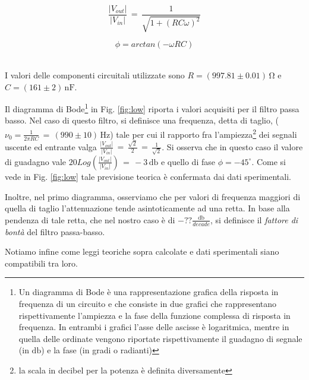 \noindent
\begin{minipage}{.5\linewidth}
\begin{equation}
\frac{|V_{out}|}{|V_{in}|}\,=\,\frac{1}{\sqrt{1+(RC\omega)^2}}
\label{eq:lowGain}
\end{equation}
\end{minipage}%
\begin{minipage}{.5\linewidth}
\begin{equation}
\phi=arctan(-\omega R C)
\label{eq:lowPhi}
\end{equation}
\end{minipage}\\

\noindent I valori delle componenti circuitali utilizzate sono $R=(997.81 \pm 0.01)\,\si{\ohm}$ e $C=(161 \pm 2)\,\si{\nano\farad}$.

Il diagramma di Bode\footnote{Un diagramma di Bode è una rappresentazione grafica della risposta in frequenza di un circuito e che consiste in due grafici che rappresentano rispettivamente l'ampiezza e la fase della funzione complessa di risposta in frequenza. In entrambi i grafici l'asse delle ascisse è logaritmica, mentre in quella delle ordinate vengono riportate rispettivamente il guadagno di segnale (in $\si{\decibel}$) e la fase (in gradi o radianti)} in Fig. \ref{fig:low} riporta i valori acquisiti per il filtro passa basso. Nel caso di questo filtro, si definisce una frequenza, detta di taglio, ($\nu_0=\frac{1}{2 \pi RC}\,=\,(990\pm10)\,\si{\hertz}$) tale per cui il rapporto fra l'ampiezza\footnote{la scala in decibel per la potenza è definita diversamente} dei segnali uscente ed entrante valga $\frac{|V_{out}|}{|V_{in}|}\,=\,\frac{\sqrt{2}}{2}\,=\,\frac{1}{\sqrt{2}}$. Si osserva che in questo caso il valore di guadagno vale $20Log(\frac{|V_{out}|}{|V_{in}|})\,=\,-3\,\si{\decibel}$ e quello di fase $\phi=-45 ^{\circ}$. Come si vede in Fig. \ref{fig:low} tale previsione teorica è confermata dai dati sperimentali.

Inoltre, nel primo diagramma, osserviamo che per valori di frequenza maggiori di quella di taglio l'attenuazione tende asintoticamente ad una retta. In base alla pendenza di tale retta, che nel nostro caso è di $-\textbf{??}\frac{\si{\decibel}}{decade}$, si definisce il \emph{fattore di bontà} del filtro passa-basso.

Notiamo infine come leggi teoriche sopra calcolate e dati sperimentali siano compatibili tra loro.
%